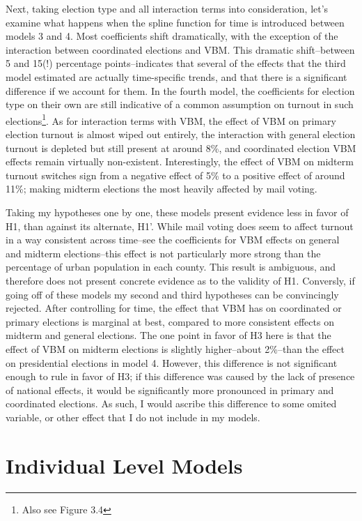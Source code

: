 \documentclass[12pt,twoside]{reedthesis}
\begin{document}
  Next, taking election type and all interaction terms into consideration,
  let's examine what happens when the spline function for time is
  introduced between models 3 and 4. Most coefficients shift dramatically,
  with the exception of the interaction between coordinated elections and
  VBM. This dramatic shift--between 5 and 15(!) percentage
  points--indicates that several of the effects that the third model
  estimated are actually time-specific trends, and that there is a
  significant difference if we account for them. In the fourth model, the
  coefficients for election type on their own are still indicative of a
  common assumption on turnout in such elections\footnote{Also see Figure
    3.4}. As for interaction terms with VBM, the effect of VBM on primary
  election turnout is almost wiped out entirely, the interaction with
  general election turnout is depleted but still present at around 8\%,
  and coordinated election VBM effects remain virtually non-existent.
  Interestingly, the effect of VBM on midterm turnout switches sign from a
  negative effect of 5\% to a positive effect of around 11\%; making
  midterm elections the most heavily affected by mail voting.
  
  Taking my hypotheses one by one, these models present evidence less in
  favor of H1, than against its alternate, H1'. While mail voting does
  seem to affect turnout in a way consistent across time--see the
  coefficients for VBM effects on general and midterm elections--this
  effect is not particularly more strong than the percentage of urban
  population in each county. This result is ambiguous, and therefore does
  not present concrete evidence as to the validity of H1. Conversly, if
  going off of these models my second and third hypotheses can be
  convincingly rejected. After controlling for time, the effect that VBM
  has on coordinated or primary elections is marginal at best, compared to
  more consistent effects on midterm and general elections. The one point
  in favor of H3 here is that the effect of VBM on midterm elections is
  slightly higher--about 2\%--than the effect on presidential elections in
  model 4. However, this difference is not significant enough to rule in
  favor of H3; if this difference was caused by the lack of presence of
  national effects, it would be significantly more pronounced in primary
  and coordinated elections. As such, I would ascribe this difference to
  some omited variable, or other effect that I do not include in my
  models.
  
  \section{Individual Level Models}\label{individual-level-models}
  
\end{document}
